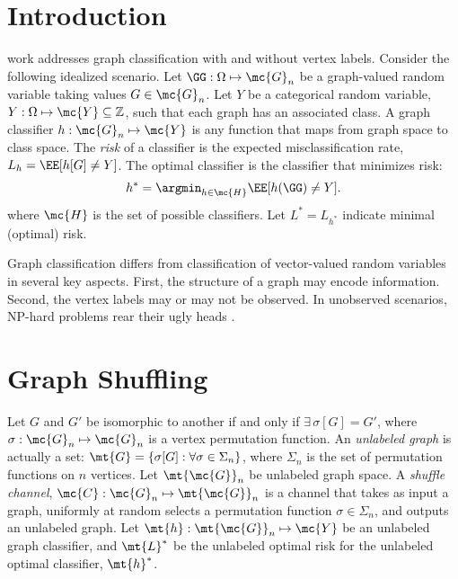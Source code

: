 \documentclass[10pt,journal,cspaper,compsoc]{IEEEtran}
\begin{document}
\maketitle
\IEEEdisplaynotcompsoctitleabstractindextext
\IEEEpeerreviewmaketitle



\section{Introduction}

  work addresses graph classification with and without vertex labels.  Consider the following idealized scenario. Let $\GG: \Omega \mapsto \mc{G}_n$ be a graph-valued random variable taking values $G\in \mc{G}_n$. 
Let $Y$ be a categorical random variable, $Y: \Omega \mapsto \mc{Y} \subseteq \mathbb{Z}$, such that each graph has an associated class.  A graph classifier $h: \mc{G}_n \mapsto \mc{Y}$ is any function that maps from graph space to class space.  The \emph{risk} of a classifier is the expected misclassification rate, $L_h=\EE[h[G]\neq Y]$.  The optimal classifier is the classifier that minimizes risk:
\begin{align}
	h^* = \argmin_{h \in \mc{H}} \EE[h(\GG) \neq Y].
\end{align}
where $\mc{H}$ is the set of possible classifiers.  Let $L^*=L_{h^*}$ indicate minimal (optimal) risk.  

Graph classification differs from classification of vector-valued random variables in several key aspects.  First, the structure of a graph may encode information.  Second, the vertex labels may or may not be observed.  In unobserved scenarios, NP-hard problems rear their ugly heads \cite{Conte04}.

\section{Graph Shuffling} %
\label{sec:graph_shuffling}


Let $G$ and $G'$ be isomorphic to another if and only if $\exists \, \sigma[G]=G'$, where  $\sigma: \mc{G}_n \mapsto \mc{G}_n$ is a vertex permutation function.   An \emph{unlabeled graph} is actually a set: $\mt{G}=\{\sigma[G]: \forall \sigma \in \Sigma_n\}$, where $\Sigma_n$ is the set of permutation functions on $n$ vertices. Let $\mt{\mc{G}}_n$ be unlabeled graph space. A \emph{shuffle channel}, $\mc{C}: \mc{G}_n \mapsto \mt{\mc{G}}_n$ is a channel that takes as input a graph, uniformly at random selects a permutation function $\sigma \in \Sigma_n$, and outputs an unlabeled graph.  Let $\mt{h}: \mt{\mc{G}}_n \mapsto \mc{Y}$ be an unlabeled graph classifier, and $\mt{L}^*$ be the unlabeled optimal risk for the unlabeled optimal classifier, $\mt{h}^*$. %
\end{document}
